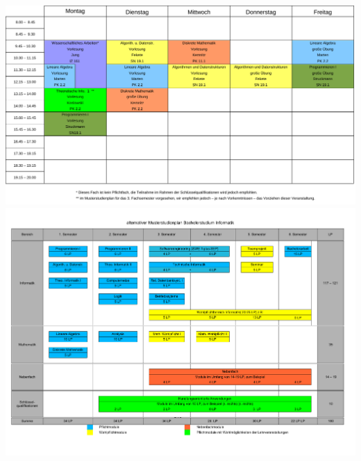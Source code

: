 \documentclass[12pt]{n-te}
\begin{document}
  
%  

%  
\renewcommand{\baselinestretch}{0.85}\normalsize
  \newpage
  \clearpage
  \newpage

    \begin{multicols}{2}

\end{multicols}
\includegraphics[totalheight=0.4\textheight, 
width=\textwidth
]{texte/nuetzliches/stundenplan}
\includegraphics[angle=90,
totalheight=\textheight
, width=\textwidth]{texte/bachelor/studienplan_neu}
\newpage
\begin{multicols}{2}

  \end{multicols}
\end{document}
